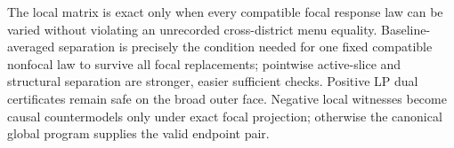 The local matrix is exact only when every compatible focal response law can be varied without violating an unrecorded cross-district menu equality.  Baseline-averaged separation is precisely the condition needed for one fixed compatible nonfocal law to survive all focal replacements; pointwise active-slice and structural separation are stronger, easier sufficient checks.  Positive LP dual certificates remain safe on the broad outer face.  Negative local witnesses become causal countermodels only under exact focal projection; otherwise the canonical global program supplies the valid endpoint pair.